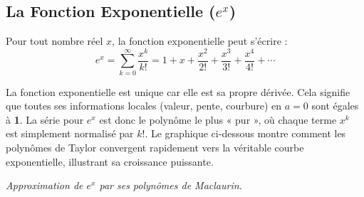 \subsection{La Fonction Exponentielle ($e^x$)}

\begin{theorembox}
Pour tout nombre réel $x$, la fonction exponentielle peut s'écrire :
$$ e^x = \sum_{k=0}^{\infty} \frac{x^k}{k!} = 1 + x + \frac{x^2}{2!} + \frac{x^3}{3!} + \frac{x^4}{4!} + \cdots $$
\end{theorembox}

\begin{intuitionbox}
La fonction exponentielle est unique car elle est sa propre dérivée. Cela signifie que toutes ses informations locales (valeur, pente, courbure) en $a=0$ sont égales à \textbf{1}. La série pour $e^x$ est donc le polynôme le plus « pur », où chaque terme $x^k$ est simplement normalisé par $k!$. Le graphique ci-dessous montre comment les polynômes de Taylor convergent rapidement vers la véritable courbe exponentielle, illustrant sa croissance puissante.

\tcblower

\centering
{}
\par\small\textit{Approximation de $e^x$ par ses polynômes de Maclaurin.}
\end{intuitionbox}

